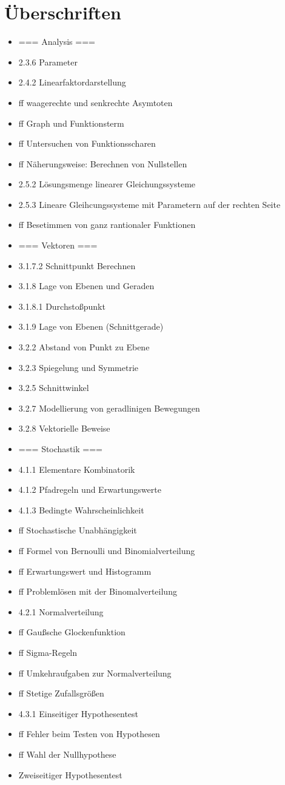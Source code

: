\section{Überschriften}
\begin{itemize}
    \item === Analysis ===
    \item 2.3.6 Parameter
    \item 2.4.2 Linearfaktordarstellung
    \item ff waagerechte und senkrechte Asymtoten
    \item ff Graph und Funktionsterm
    \item ff Untersuchen von Funktionsscharen
    \item ff Näherungsweise: Berechnen von Nullstellen
    \item 2.5.2 Lösungsmenge linearer Gleichungssysteme
    \item 2.5.3 Lineare Gleihcungssysteme mit Parametern auf der rechten Seite
    \item ff Besetimmen von ganz rantionaler Funktionen
    \item === Vektoren ===
    \item 3.1.7.2 Schnittpunkt Berechnen
    \item 3.1.8 Lage von Ebenen und Geraden
    \item 3.1.8.1 Durchstoßpunkt
    \item 3.1.9 Lage von Ebenen (Schnittgerade)
    \item 3.2.2 Abstand von Punkt zu Ebene
    \item 3.2.3 Spiegelung und Symmetrie
    \item 3.2.5 Schnittwinkel
    \item 3.2.7 Modellierung von geradlinigen Bewegungen
    \item 3.2.8 Vektorielle Beweise
    \item === Stochastik ===
    \item 4.1.1 Elementare Kombinatorik
    \item 4.1.2 Pfadregeln und Erwartungswerte
    \item 4.1.3 Bedingte Wahrscheinlichkeit
    \item ff Stochastische Unabhängigkeit
    \item ff Formel von Bernoulli und Binomialverteilung
    \item ff Erwartungswert und Histogramm
    \item ff Problemlösen mit der Binomalverteilung
    \item 4.2.1 Normalverteilung
    \item ff Gaußsche Glockenfunktion
    \item ff Sigma-Regeln
    \item ff Umkehraufgaben zur Normalverteilung
    \item ff Stetige Zufallsgrößen 
    \item 4.3.1 Einseitiger Hypothesentest
    \item ff Fehler beim Testen von Hypothesen
    \item ff Wahl der Nullhypothese
    \item Zweiseitiger Hypothesentest
\end{itemize}

